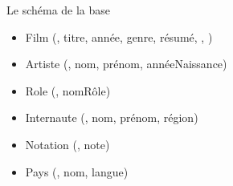 \begin{tsp}{Le schéma de la base}{
\begin{itemize}
  \item Film (, titre, année, genre, résumé,
                                , )
 \item Artiste (, nom, prénom, annéeNaissance)
  \item Role (, nomRôle)
   \item Internaute (, nom, prénom, région)
  \item Notation (, note)
   \item Pays (, nom, langue)
\end{itemize}

}\end{tsp}

